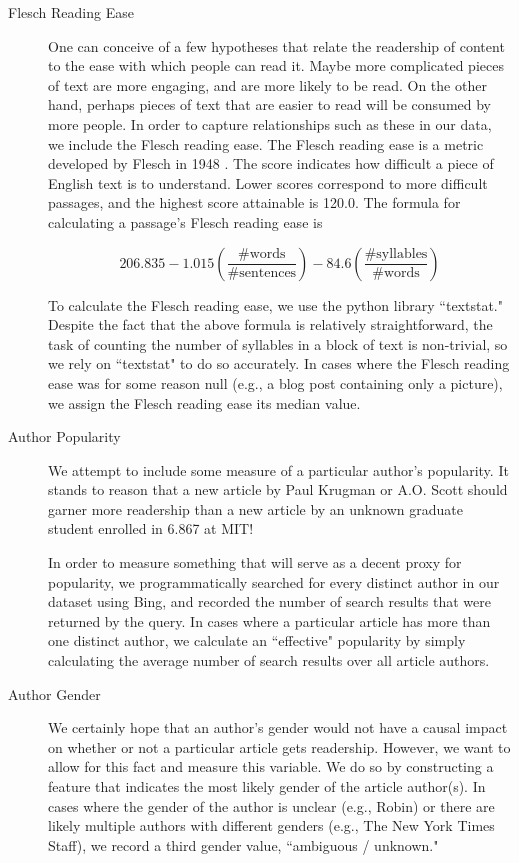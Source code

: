 \documentclass[fleqn,12pt]{SelfArx} %
\begin{document}
\begin{description}
	\item[Flesch Reading Ease] One can conceive of a few hypotheses that relate the readership of content to the ease with which people can read it. Maybe more complicated pieces of text are more engaging, and are more likely to be read. On the other hand, perhaps pieces of text that are easier to read will be consumed by more people. In order to capture relationships such as these in our data, we include the Flesch reading ease. The Flesch reading ease is a metric developed by Flesch in 1948 \cite{flesch1948new}. The score indicates how difficult a piece of English text is to understand. Lower scores correspond to more difficult passages, and the highest score attainable is 120.0. The formula for calculating a passage's Flesch reading ease is
	
	\begin{equation}
	206.835 - 1.015 \left ( \frac{\textrm{\# words}}{\textrm{\# sentences}} \right ) - 84.6 \left ( \frac{\textrm{\# syllables}}{\textrm{\# words}} \right )
	\end{equation}
	
	To calculate the Flesch reading ease, we use the python library ``textstat." Despite the fact that the above formula is relatively straightforward, the task of counting the number of syllables in a block of text is non-trivial, so we rely on ``textstat" to do so accurately. In cases where the Flesch reading ease was for some reason null (e.g., a blog post containing only a picture), we assign the Flesch reading ease its median value.
	
	\item[Author Popularity] We attempt to include some measure of a particular author's popularity. It stands to reason that a new article by Paul Krugman or A.O. Scott should garner more readership than a new article by an unknown graduate student enrolled in 6.867 at MIT! 
	
	In order to measure something that will serve as a decent proxy for popularity, we programmatically searched for every distinct author in our dataset using Bing, and recorded the number of search results that were returned by the query. In cases where a particular article has more than one distinct author, we calculate an ``effective" popularity by simply calculating the average number of search results over all article authors.
	
	\item[Author Gender] We certainly hope that an author's gender would not have a causal impact on whether or not a particular article gets readership. However, we want to allow for this fact and measure this variable. We do so by constructing a feature that indicates the most likely gender of the article author(s). In cases where the gender of the author is unclear (e.g., Robin) or there are likely multiple authors with different genders (e.g., The New York Times Staff), we record a third gender value, ``ambiguous / unknown." 
	

\end{description}
\end{document}
